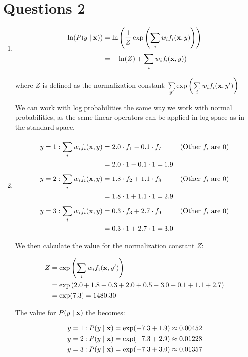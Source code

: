 \documentclass[a4paper]{article}
\begin{document}
\section*{Questions 2}
\begin{enumerate}
    \item

\begin{align}
    \ln (P(y \mid\mathbf{x})) &= \ln \left(\frac{1}{Z}\exp\left(\sum\limits_{i}^{}w_if_i(\mathbf{x}, y)\right)\right)\\
    &=-\ln(Z) + \sum\limits_{i}^{}w_if_i(\mathbf{x}, y))\\
\end{align}

where $Z$ is defined as the normalization constant:
$\sum\limits_{y'}^{}\exp\left(\sum\limits_{i}^{}w_if_i(\mathbf{x}, y')\right)$

We can work with log probabilities the same way we work with normal probabilities, as the same linear operators can be applied in log space as in the standard space.

\item
    \begin{align}
        y=1 :\sum\limits_{i}^{}w_if_i(\mathbf{x}, y) &= 2.0\cdot f_1 -0.1\cdot f_7 &(\text{Other $f_i$ are 0})\\
        &= 2.0\cdot 1 -0.1\cdot 1= 1.9\\
        y=2 :\sum\limits_{i}^{}w_if_i(\mathbf{x}, y) &= 1.8\cdot f_2 + 1.1\cdot f_8 &(\text{Other $f_i$ are 0})\\
        &= 1.8\cdot 1 + 1.1\cdot 1= 2.9\\
        y=3 :\sum\limits_{i}^{}w_if_i(\mathbf{x}, y) &= 0.3\cdot f_3 + 2.7\cdot f_9 &(\text{Other $f_i$ are 0})\\
        &= 0.3\cdot 1 + 2.7\cdot 1= 3.0
    \end{align}

    We then calculate the value for the normalization constant $Z$:

    \begin{align}
        Z &= \exp\left(\sum\limits_{i}^{}w_if_i(\mathbf{x}, y')\right)\\
        &= \exp\left(2.0+1.8+0.3+2.0+0.5-3.0-0.1+1.1+2.7\right)\\
        &=\exp(7.3) = 1480.30
    \end{align}

    The value for $P(y\mid\mathbf{x})$ the becomes:

    \begin{align}
        y=1 : P(y\mid\mathbf{x}) &= \exp(-7.3 + 1.9) \approx 0.00452\\
        y=2 : P(y\mid\mathbf{x}) &= \exp(-7.3 + 2.9) \approx 0.01228\\
        y=3 : P(y\mid\mathbf{x}) &= \exp(-7.3 + 3.0) \approx 0.01357
    \end{align}

\end{enumerate}
\end{document}
